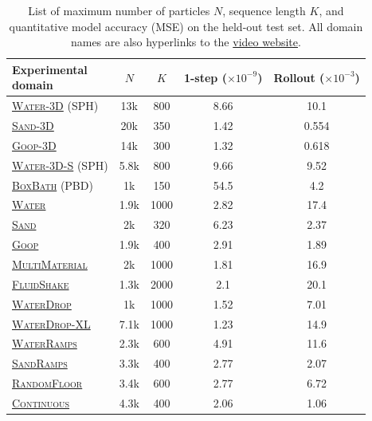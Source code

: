 \documentclass{article}
\newcommand{\multiline}[3][11mm]{\begin{minipage}[c][#1]{#2}#3\end{minipage}}
\newcommand\domain[1]{\textsc{#1}}
\newcommand\viddambreak[1]{\href{http://tny.sh/QpFGhIK}{#1}}
\newcommand\vidmulti[1]{\href{http://tny.sh/bf5FJnN}{#1}}
\newcommand\vidcont[1]{\href{http://tny.sh/lLvCAc5}{#1}}
\newcommand\vidobs[1]{\href{http://tny.sh/MfmIF9H}{#1}}
\newcommand\vidshake[1]{\href{http://tny.sh/dGoSxSA}{#1}}
\newcommand\vidboxbath[1]{\href{http://tny.sh/mrOkfpg}{#1}}
\newcommand\vidthreedsand[1]{\href{http://tny.sh/4WbbnXU}{#1}}
\newcommand\vidthreedgoop[1]{\href{http://tny.sh/Ojm7Olb}{#1}}
\newcommand\vidthreedwater[1]{\href{http://tny.sh/jFszr4x}{#1}}
\newcommand\vidtwodsand[1]{\href{http://tny.sh/2M64scu}{#1}}
\newcommand\vidtwodgoop[1]{\href{http://tny.sh/uImt11M}{#1}}
\newcommand\vidtwodwater[1]{\href{http://tny.sh/xlDxA0A}{#1}}
\newcommand\vidthreedwaters[1]{\href{http://tny.sh/water3ds}{#1}}
\newcommand\vidsandramps[1]{\href{http://tny.sh/sandramps}{#1}}
\newcommand\vidwaterramps[1]{\href{http://tny.sh/waterramps}{#1}}
\begin{document}
\begin{table}[t!]
\begin{small}
\begin{center}
\begin{tabular}[p]{|l||c|c|c|c|}
	\hline
	\multiline{20mm}{\textbf{Experimental\\domain}} & 
	\multiline{4mm}{\centering$N$} & 
	\multiline{4mm}{\centering$K$}&
	\multiline{10mm}{\centering\textbf{1-step} \\ ($\times10^{-9}$)}  &
	\multiline{10mm}{\centering\textbf{Rollout} \\ ($\times10^{-3}$)}\\\hline\hline
	\vidthreedwater{\domain{Water-3D}} (SPH) & 13k & 800 & 8.66 & 10.1 \\\hline
    \vidthreedsand{\domain{Sand-3D}}  & 20k & 350 & 1.42 & 0.554 \\\hline
    \vidthreedgoop{\domain{Goop-3D}}  & 14k & 300 & 1.32 & 0.618 \\\hline
    \vidthreedwaters{\domain{Water-3D-S}} (SPH) & 5.8k & 800 & 9.66 & 9.52 \\\hline
    \vidboxbath{\domain{BoxBath}} (PBD) & 1k & 150 & 54.5 & 4.2 \\\hline\hline
    \vidtwodwater{\domain{Water}}  & 1.9k & 1000 & 2.82 & 17.4 \\\hline
    \vidtwodsand{\domain{Sand}}  & 2k & 320 & 6.23 & 2.37 \\\hline
    \vidtwodgoop{\domain{Goop}}  & 1.9k & 400 & 2.91 & 1.89 \\\hline
    \vidmulti{\domain{MultiMaterial}}  & 2k & 1000 & 1.81 & 16.9 \\\hline
    \vidshake{\domain{FluidShake}}  & 1.3k & 2000 & 2.1 & 20.1 \\\hline
    \viddambreak{\domain{WaterDrop}}  & 1k & 1000 & 1.52 & 7.01 \\\hline
    \viddambreak{\domain{WaterDrop-XL}}  & 7.1k & 1000 & 1.23 & 14.9 \\\hline
    \vidwaterramps{\domain{WaterRamps}}  & 2.3k & 600 & 4.91 & 11.6 \\\hline
    \vidsandramps{\domain{SandRamps}}  & 3.3k & 400 & 2.77 & 2.07 \\\hline
    \vidobs{\domain{RandomFloor}}  & 3.4k & 600 & 2.77 & 6.72 \\\hline
    \vidcont{\domain{Continuous}}  & 4.3k & 400 & 2.06 & 1.06 \\\hline
\end{tabular}
\end{center}
\end{small}
\caption{
\label{fig:mse}List of maximum number of particles $N$, sequence length $K$, and 
quantitative model accuracy (MSE) on the held-out test set. All domain names are also hyperlinks to the \href{https://sites.google.com/view/learning-to-simulate}{video website}.}
\end{table} 
%
\end{document}
